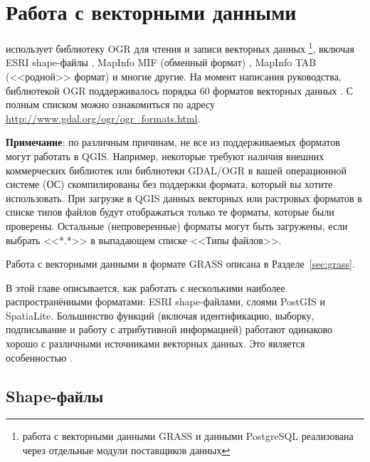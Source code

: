 
\chapter{Работа с векторными данными}\label{label_workingvector}


\qg использует библиотеку OGR для чтения и записи векторных данных
\footnote{работа с векторными данными GRASS и данными PostgreSQL реализована
через отдельные модули поставщиков данных}, включая ESRI shape-файлы
, MapInfo MIF (обменный формат)
, MapInfo TAB (<<родной>> формат)
 и многие другие. На момент написания руководства,
библиотекой OGR поддерживалось порядка 60 форматов векторных данных \cite{OGRweb}.
С полным списком можно ознакомиться по адресу
\url{http://www.gdal.org/ogr/ogr_formats.html}.

\textbf{Примечание}: по различным причинам, не все из поддерживаемых
форматов могут работать в QGIS. Например, некоторые требуют наличия
внешних коммерческих библиотек или библиотеки GDAL/OGR в вашей операционной
системе (ОС) скомпилированы без поддержки формата, который вы хотите
использовать. При загрузке в QGIS данных векторных или растровых форматов
в списке типов файлов будут отображаться только те форматы, которые были
проверены. Остальные (непроверенные) форматы могут быть загружены, если
выбрать <<*.*>> в выпадающем списке <<Типы файлов>>.

Работа с векторными данными в формате GRASS описана в Разделе~\ref{sec:grass}.

В этой главе описывается, как работать с несколькими наиболее
распространёнными форматами: ESRI shape-файлами, слоями PostGIS и SpatiaLite.
Большинство функций \qg (включая идентификацию, выборку, подписывание
и работу с атрибутивной информацией) работают одинаково хорошо с различными
источниками векторных данных. Это является особенностью \qg .

\section{Shape-файлы}


